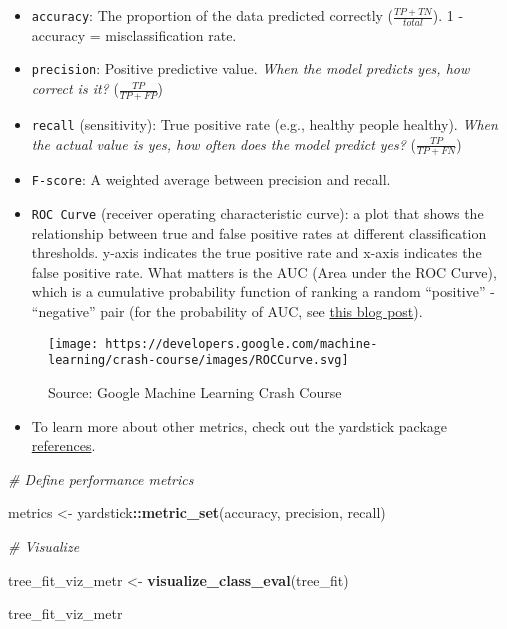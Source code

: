 \documentclass[
]{book}
\newenvironment{Shaded}{\begin{snugshade}}{\end{snugshade}}
\newcommand{\CommentTok}[1]{\textcolor[rgb]{0.56,0.35,0.01}{\textit{#1}}}
\newcommand{\KeywordTok}[1]{\textcolor[rgb]{0.13,0.29,0.53}{\textbf{#1}}}
\newcommand{\NormalTok}[1]{#1}
\newcommand{\OperatorTok}[1]{\textcolor[rgb]{0.81,0.36,0.00}{\textbf{#1}}}
\newcommand{\StringTok}[1]{\textcolor[rgb]{0.31,0.60,0.02}{#1}}
\providecommand{\tightlist}{%
  \setlength{\itemsep}{0pt}\setlength{\parskip}{0pt}}
\begin{document}
\begin{itemize}
\item
  \texttt{accuracy}: The proportion of the data predicted correctly (\(\frac{TP + TN}{total}\)). 1 - accuracy = misclassification rate.
\item
  \texttt{precision}: Positive predictive value. \emph{When the model predicts yes, how correct is it?} (\(\frac{TP}{TP + FP}\))
\item
  \texttt{recall} (sensitivity): True positive rate (e.g., healthy people healthy). \emph{When the actual value is yes, how often does the model predict yes?} (\(\frac{TP}{TP + FN}\))
\item
  \texttt{F-score}: A weighted average between precision and recall.
\item
  \texttt{ROC\ Curve} (receiver operating characteristic curve): a plot that shows the relationship between true and false positive rates at different classification thresholds. y-axis indicates the true positive rate and x-axis indicates the false positive rate. What matters is the AUC (Area under the ROC Curve), which is a cumulative probability function of ranking a random ``positive'' - ``negative'' pair (for the probability of AUC, see \href{https://www.alexejgossmann.com/auc/}{this blog post}).
\end{itemize}

\begin{figure}
\centering
\texttt{[image: https://developers.google.com/machine-learning/crash-course/images/ROCCurve.svg]}
\caption{Source: Google Machine Learning Crash Course}
\end{figure}

\begin{itemize}
\tightlist
\item
  To learn more about other metrics, check out the yardstick package \href{https://yardstick.tidymodels.org/reference/index.html}{references}.
\end{itemize}

\begin{Shaded}
\begin{Highlighting}[]
\CommentTok{\# Define performance metrics}

\NormalTok{metrics \textless{}{-}}\StringTok{ }\NormalTok{yardstick}\OperatorTok{::}\KeywordTok{metric\_set}\NormalTok{(accuracy, precision, recall)}

\CommentTok{\# Visualize}

\NormalTok{tree\_fit\_viz\_metr \textless{}{-}}\StringTok{ }\KeywordTok{visualize\_class\_eval}\NormalTok{(tree\_fit)}

\NormalTok{tree\_fit\_viz\_metr}
\end{Highlighting}
\end{Shaded}
\end{document}
